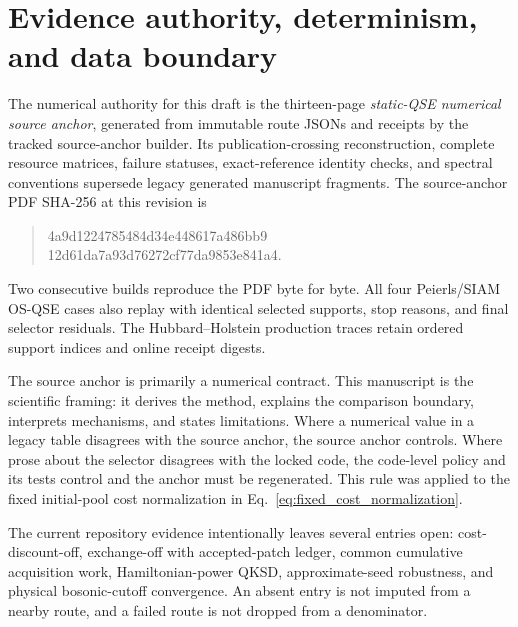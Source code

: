 \documentclass[
  reprint,
  amsmath,
  amssymb,
  aps,
  pra,
  nofootinbib,
  superscriptaddress,
  floatfix
]{revtex4-2}
\newcommand{\sourceanchor}{\textit{static-QSE numerical source anchor}}
\begin{document}
\section{Evidence authority, determinism, and data boundary}
\label{app:evidence}

The numerical authority for this draft is the thirteen-page
\sourceanchor, generated from immutable route JSONs and receipts by the
tracked source-anchor builder.  Its
publication-crossing reconstruction, complete resource matrices, failure
statuses, exact-reference identity checks, and spectral conventions supersede
legacy generated manuscript fragments.  The source-anchor PDF SHA-256 at this
revision is
\begin{quote}
\small\ttfamily
4a9d1224785484d34e448617a486bb9\\
12d61da7a93d76272cf77da9853e841a4.
\end{quote}
Two consecutive builds reproduce the PDF byte for byte.  All four
Peierls/SIAM OS-QSE cases also replay with identical selected supports, stop
reasons, and final selector residuals.  The Hubbard--Holstein production
traces retain ordered support indices and online receipt digests.

The source anchor is primarily a numerical contract.  This manuscript is the
scientific framing: it derives the method, explains the comparison boundary,
interprets mechanisms, and states limitations.  Where a numerical value in a
legacy table disagrees with the source anchor, the source anchor controls.
Where prose about the selector disagrees with the locked code, the code-level
policy and its tests control and the anchor must be regenerated.  This rule
was applied to the fixed initial-pool cost normalization in
Eq.~\eqref{eq:fixed_cost_normalization}.

The current repository evidence intentionally leaves several entries open:
cost-discount-off, exchange-off with accepted-patch ledger, common cumulative
acquisition work, Hamiltonian-power QKSD, approximate-seed robustness, and
physical bosonic-cutoff convergence.  An absent entry is not imputed from a
nearby route, and a failed route is not dropped from a denominator.
\end{document}
